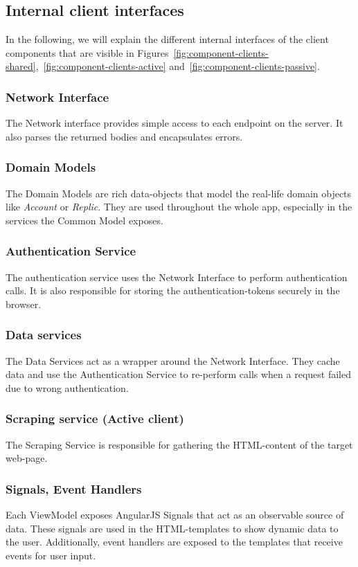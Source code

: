 \subsection{Internal client interfaces}\label{subsec:internal-client-interfaces}
In the following, we will explain the different internal interfaces of the client components that are visible in Figures~\ref{fig:component-clients-shared},~\ref{fig:component-clients-active} and~\ref{fig:component-clients-passive}.

\subsubsection{Network Interface}
The Network interface provides simple access to each endpoint on the server.
It also parses the returned bodies and encapsulates errors.

\subsubsection{Domain Models}
The Domain Models are rich data-objects that model the real-life domain objects like \textit{Account} or \textit{Replic}.
They are used throughout the whole app, especially in the services the Common Model exposes.

\subsubsection{Authentication Service}
The authentication service uses the Network Interface to perform authentication calls.
It is also responsible for storing the authentication-tokens securely in the browser.

\subsubsection{Data services}
The Data Services act as a wrapper around the Network Interface.
They cache data and use the Authentication Service to re-perform calls when a request failed due to wrong authentication.

\subsubsection{Scraping service (Active client)}
The Scraping Service is responsible for gathering the HTML-content of the target web-page.

\subsubsection{Signals, Event Handlers}
Each ViewModel exposes AngularJS Signals that act as an observable source of data.
These signals are used in the HTML-templates to show dynamic data to the user. \newline
Additionally, event handlers are exposed to the templates that receive events for user input.

